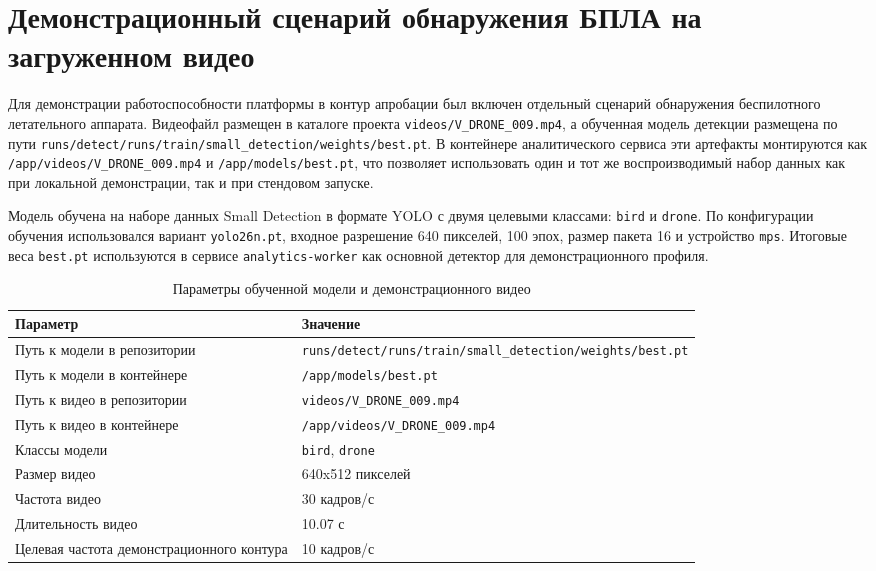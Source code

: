 \section{Демонстрационный сценарий обнаружения БПЛА на загруженном видео}

Для демонстрации работоспособности платформы в контур апробации был включен отдельный сценарий обнаружения беспилотного летательного аппарата. Видеофайл размещен в каталоге проекта \nolinkurl{videos/V_DRONE_009.mp4}, а обученная модель детекции размещена по пути \nolinkurl{runs/detect/runs/train/small_detection/weights/best.pt}. В контейнере аналитического сервиса эти артефакты монтируются как \nolinkurl{/app/videos/V_DRONE_009.mp4} и \nolinkurl{/app/models/best.pt}, что позволяет использовать один и тот же воспроизводимый набор данных как при локальной демонстрации, так и при стендовом запуске.

Модель обучена на наборе данных Small Detection в формате YOLO с двумя целевыми классами: \texttt{bird} и \texttt{drone}. По конфигурации обучения использовался вариант \texttt{yolo26n.pt}, входное разрешение 640 пикселей, 100 эпох, размер пакета 16 и устройство \texttt{mps}. Итоговые веса \texttt{best.pt} используются в сервисе \texttt{analytics-worker} как основной детектор для демонстрационного профиля.

\begin{table}[H]
\caption{Параметры обученной модели и демонстрационного видео}
\label{tab:drone_demo_artifacts}
\begin{tabularx}{\textwidth}{@{}>{\raggedright\arraybackslash}p{}X@{}}
\toprule
Параметр & Значение \\
\midrule
Путь к модели в репозитории & \nolinkurl{runs/detect/runs/train/small_detection/weights/best.pt} \\
Путь к модели в контейнере & \nolinkurl{/app/models/best.pt} \\
Путь к видео в репозитории & \nolinkurl{videos/V_DRONE_009.mp4} \\
Путь к видео в контейнере & \nolinkurl{/app/videos/V_DRONE_009.mp4} \\
Классы модели & \texttt{bird}, \texttt{drone} \\
Размер видео & 640x512 пикселей \\
Частота видео & 30 кадров/с \\
Длительность видео & 10.07 с \\
Целевая частота демонстрационного контура & 10 кадров/с \\
\bottomrule
\end{tabularx}
\end{table}

